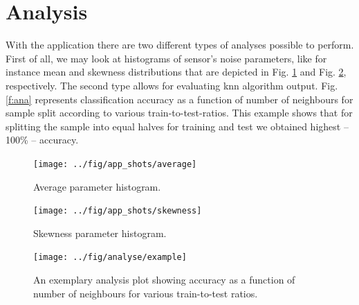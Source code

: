 \documentclass[a4paper,10pt]{article}
\begin{document}
\section{Analysis}

With the application there are two different types of analyses possible to perform. First of all, we may look at histograms of sensor's noise parameters, like for instance mean and skewness distributions that are depicted in Fig. \ref{f:mean} and Fig. \ref{f:ske}, respectively. The second type allows for evaluating knn algorithm output. Fig. \ref{f:ana} represents classification accuracy as a function of number of neighbours for sample split according to various train-to-test-ratios. This example shows that for splitting the sample into equal halves for training and test we obtained highest -- 100\% -- accuracy.


\begin{figure}[H] \centering
    \texttt{[image: ../fig/app\_shots/average]}
    \caption{Average parameter histogram.}
    \label{f:mean}
\end{figure}
\begin{figure}[H] \centering
    \texttt{[image: ../fig/app\_shots/skewness]}
    \caption{Skewness parameter histogram.}
    \label{f:ske}
\end{figure}

\begin{figure}[H] \centering
    \texttt{[image: ../fig/analyse/example]}
    \caption{An exemplary analysis plot showing accuracy as a function of number of neighbours for various train-to-test ratios.}
\end{figure}
\end{document}
